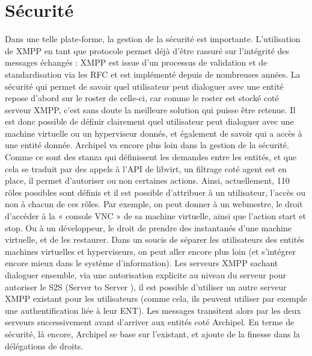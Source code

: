     \section{Sécurité}
Dans une telle plate-forme, la gestion de la sécurité est importante. L'utilisation de XMPP en tant que
protocole permet déjà d'être rassuré sur l'intégrité des messages échangés : XMPP est issue d'un
processus de validation et de standardisation via les RFC et est implémenté depuis de nombreuses
années.\newline
La sécurité qui permet de savoir quel utilisateur peut dialoguer avec une entité repose d'abord sur le
roster de celle-ci, car comme le roster est stocké coté serveur XMPP, c'est sans doute la meilleure solution
qui puisse être retenue. Il est donc possible de définir clairement quel utilisateur peut dialoguer avec une
machine virtuelle ou un hyperviseur donnés, et également de savoir qui a accès à une entité donnée.
Archipel va encore plus loin dans la gestion de la sécurité. Comme ce sont des stanza qui définissent les
demandes entre les entités, et que cela se traduit par des appels à l'API de libvirt, un filtrage coté agent
est en place, il permet d'autoriser ou non certaines actions. Ainsi, actuellement, 110 rôles possibles sont
définis et il est possible d'attribuer à un utilisateur, l'accès ou non à chacun de ces rôles. Par exemple, on
peut donner à un webmestre, le droit d’accéder à la « console VNC » de sa machine virtuelle, ainsi que
l'action start et stop. Ou à un développeur, le droit de prendre des instantanés d'une machine virtuelle, et
de les restaurer.\newline
Dans un soucis de séparer les utilisateurs des entités machines virtuelles et hyperviseurs, on peut aller
encore plus loin (et s'intégrer encore mieux dans le système d'information). Les serveurs XMPP sachant
dialoguer ensemble, via une autorisation explicite au niveau du serveur pour autoriser le S2S (Server to
Server ), il est possible d'utiliser un autre serveur XMPP existant pour les utilisateurs (comme cela, ils
peuvent utiliser par exemple une authentification liée à leur ENT). Les messages transitent alors par les
deux serveurs successivement avant d'arriver aux entités coté Archipel.\newline
En terme de sécurité, là encore, Archipel se base sur l'existant, et ajoute de la finesse dans la délégations
de droits.\newline

